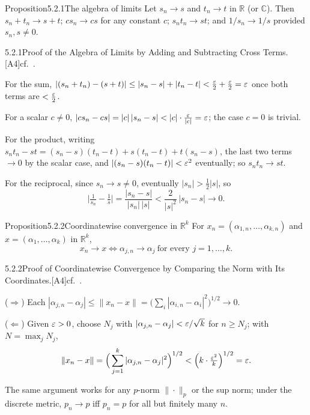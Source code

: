 \documentclass[main.tex]{subfiles}
\begin{document}

\begin{Obj}{Proposition}{5.2.1}{The algebra of limits}
Let $s_n\to s$ and $t_n\to t$ in $\mathbb R$ (or $\mathbb C$). Then $s_n+t_n\to s+t$; $cs_n\to cs$ for
any constant $c$; $s_nt_n\to st$; and $1/s_n\to1/s$ provided $s_n,s\neq0$.
\end{Obj}
\begin{Prf}{5.2.1}{Proof of the Algebra of Limits by Adding and Subtracting Cross Terms.}{[A4]\quad cf.\ .}
\item For the sum, $|(s_n+t_n)-(s+t)|\le|s_n-s|+|t_n-t|<\tfrac{\varepsilon}2+\tfrac{\varepsilon}2=\varepsilon$ once both
  terms are $<\tfrac{\varepsilon}2$.
\item For a scalar $c\neq0$, $|cs_n-cs|=|c|\,|s_n-s|<|c|\cdot\tfrac{\eps}{|c|}=\eps$; the case $c=0$
  is trivial.
\item For the product, writing $s_nt_n-st=(s_n-s)(t_n-t)+s(t_n-t)+t(s_n-s)$, the last two terms
  $\to0$ by the scalar case, and $|(s_n-s)(t_n-t)|<\varepsilon^2$ eventually; so $s_nt_n\to st$.
\item For the reciprocal, since $s_n\to s\neq0$, eventually $|s_n|>\tfrac12|s|$, so
  \[ \Big|\tfrac1{s_n}-\tfrac1s\Big|=\frac{|s_n-s|}{|s_n|\,|s|}<\frac{2}{|s|^2}\,|s_n-s|\to0. \]
\end{Prf}

\begin{Obj}{Proposition}{5.2.2}{Coordinatewise convergence in $\mathbb R^k$}
For $x_n=(\alpha_{1,n},\dots,\alpha_{k,n})$ and $x=(\alpha_1,\dots,\alpha_k)$ in $\mathbb R^k$,
\[ x_n\to x \iff \alpha_{j,n}\to\alpha_j\ \text{for every }j=1,\dots,k. \]
\end{Obj}
\begin{Prf}{5.2.2}{Proof of Coordinatewise Convergence by Comparing the Norm with Its Coordinates.}{[A4]\quad cf.\ .}
\item ($\Rightarrow$) Each $|\alpha_{j,n}-\alpha_j|\le\|x_n-x\|=\big(\sum_i|\alpha_{i,n}-\alpha_i|^2
  \big)^{1/2}\to0$.
\item ($\Leftarrow$) Given $\varepsilon>0$, choose $N_j$ with $|\alpha_{j,n}-\alpha_j|<\varepsilon/\sqrt k$ for
  $n\ge N_j$; with $N=\max_j N_j$,
  \[ \|x_n-x\|=\Big(\sum_{j=1}^k|\alpha_{j,n}-\alpha_j|^2\Big)^{1/2}<\Big(k\cdot\tfrac{\varepsilon^2}{k}
     \Big)^{1/2}=\varepsilon. \]
\end{Prf}

\noindent The same argument works for any $p$-norm $\|\cdot\|_p$ or the sup norm; under the discrete
metric, $p_n\to p$ iff $p_n=p$ for all but finitely many $n$.
\end{document}
